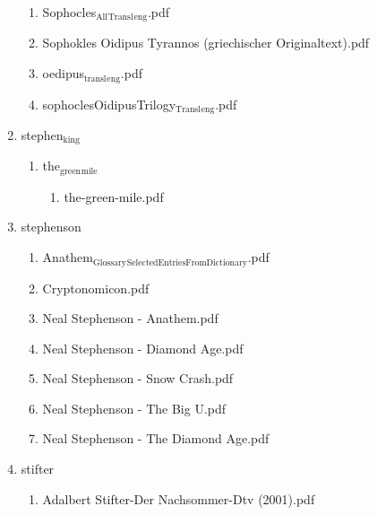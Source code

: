 \documentclass[11pt]{article}
\begin{document}
\begin{enumerate}
\begin{enumerate}
\item Sophocles$_{\text{All}}$$_{\text{Transl}}$$_{\text{eng}}$.pdf
\label{sec-1-1-1-1-28-28-6}

\item Sophokles  Oidipus Tyrannos (griechischer Originaltext).pdf
\label{sec-1-1-1-1-28-28-7}

\item oedipus$_{\text{transl}}$$_{\text{eng}}$.pdf
\label{sec-1-1-1-1-28-28-8}

\item sophoclesOidipusTrilogy$_{\text{Transl}}$$_{\text{eng}}$.pdf
\label{sec-1-1-1-1-28-28-9}
\end{enumerate}

\item stephen$_{\text{king}}$
\label{sec-1-1-1-1-28-29}
\begin{enumerate}
\item the$_{\text{green}}$$_{\text{mile}}$
\label{sec-1-1-1-1-28-29-1}
\begin{enumerate}
\item the-green-mile.pdf
\label{sec-1-1-1-1-28-29-1-1}
\end{enumerate}
\end{enumerate}

\item stephenson
\label{sec-1-1-1-1-28-30}
\begin{enumerate}
\item Anathem$_{\text{Glossary}}$$_{\text{SelectedEntriesFromDictionary}}$.pdf
\label{sec-1-1-1-1-28-30-1}

\item Cryptonomicon.pdf
\label{sec-1-1-1-1-28-30-2}

\item Neal Stephenson - Anathem.pdf
\label{sec-1-1-1-1-28-30-3}

\item Neal Stephenson - Diamond Age.pdf
\label{sec-1-1-1-1-28-30-4}

\item Neal Stephenson - Snow Crash.pdf
\label{sec-1-1-1-1-28-30-5}

\item Neal Stephenson - The Big U.pdf
\label{sec-1-1-1-1-28-30-6}

\item Neal Stephenson - The Diamond Age.pdf
\label{sec-1-1-1-1-28-30-7}
\end{enumerate}

\item stifter
\label{sec-1-1-1-1-28-31}
\begin{enumerate}
\item Adalbert Stifter-Der Nachsommer-Dtv (2001).pdf
\label{sec-1-1-1-1-28-31-1}


\end{enumerate}
\end{enumerate}
\end{document}
